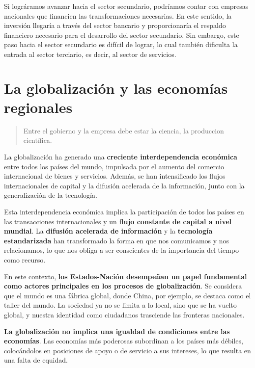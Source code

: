 \documentclass[
  a4paper,
]{article}
\begin{document}
Si lográramos avanzar hacia el sector secundario, podríamos contar con
empresas nacionales que financien las transformaciones necesarias. En
este sentido, la inversión llegaría a través del sector bancario y
proporcionaría el respaldo financiero necesario para el desarrollo del
sector secundario. Sin embargo, este paso hacia el sector secundario es
difícil de lograr, lo cual también dificulta la entrada al sector
terciario, es decir, al sector de servicios.

\section{La globalización y las economías
regionales}\label{la-globalizaciuxf3n-y-las-economuxedas-regionales}

\begin{quote}
Entre el gobierno y la empresa debe estar la ciencia, la produccion
científica.
\end{quote}

La globalización ha generado una \textbf{creciente interdependencia
económica} entre todos los países del mundo, impulsada por el aumento
del comercio internacional de bienes y servicios. Además, se han
intensificado los flujos internacionales de capital y la difusión
acelerada de la información, junto con la generalización de la
tecnología.

Esta interdependencia económica implica la participación de todos los
países en las transacciones internacionales y un \textbf{flujo constante
de capital a nivel mundial}. La \textbf{difusión acelerada de
información} y la \textbf{tecnología estandarizada} han transformado la
forma en que nos comunicamos y nos relacionamos, lo que nos obliga a ser
conscientes de la importancia del tiempo como recurso.

En este contexto, \textbf{los Estados-Nación desempeñan un papel
fundamental como actores principales en los procesos de globalización}.
Se considera que el mundo es una fábrica global, donde China, por
ejemplo, se destaca como el taller del mundo. La sociedad ya no se
limita a lo local, sino que se ha vuelto global, y nuestra identidad
como ciudadanos trasciende las fronteras nacionales.

\textbf{La globalización no implica una igualdad de condiciones entre
las economías}. Las economías más poderosas subordinan a los países más
débiles, colocándolos en posiciones de apoyo o de servicio a sus
intereses, lo que resulta en una falta de equidad.
\end{document}
